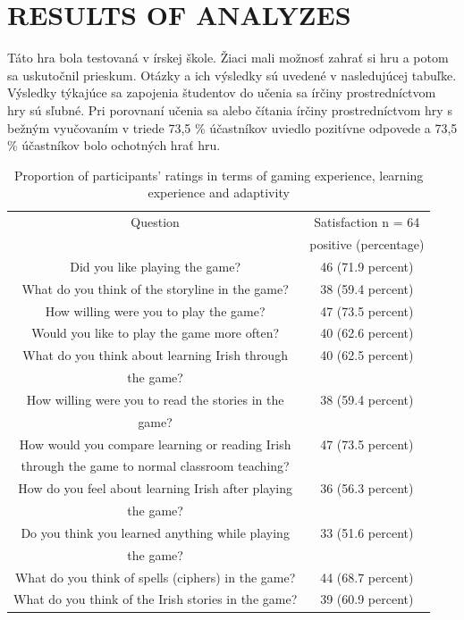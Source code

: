 \documentclass[10pt,twoside,slovak,a4paper]{article}
\begin{document}
\section{RESULTS OF ANALYZES }
\qquad Táto hra bola testovaná v írskej škole. Žiaci mali možnosť zahrať si hru a potom sa uskutočnil prieskum. Otázky a ich výsledky sú uvedené v nasledujúcej tabuľke. Výsledky týkajúce sa zapojenia študentov do učenia sa írčiny prostredníctvom hry sú sľubné. Pri porovnaní učenia sa alebo čítania írčiny prostredníctvom hry s bežným vyučovaním v triede 73,5 \% účastníkov uviedlo pozitívne odpovede a 73,5 \% účastníkov bolo ochotných hrať hru.\\
\begin{table}
\centering
\begin{tabular}{|c|c|}
\hline
Question &Satisfaction n = 64\\
          &positive (percentage)\\
\hline
Did you like playing the game? &46 (71.9 percent)\\
\hline
What do you think of the storyline in the game? & 38 (59.4 percent)\\
\hline
How willing were you to play the game?& 47 (73.5 percent)\\
\hline
Would you like to play the game more often? &40 (62.6 percent)\\
\hline
What do you think about learning Irish through &40 (62.5 percent)\\
the game? &\\
\hline
How willing were you to read the stories in the&38 (59.4 percent)\\
game?&\\
\hline
How would you compare learning or reading Irish &47 (73.5 percent)\\
through the game to normal classroom teaching?&\\
\hline
How do you feel about learning Irish after playing & 36 (56.3 percent)\\
the game? &\\
\hline
Do you think you learned anything while playing & 33 (51.6 percent)\\
the game? &\\
\hline
What do you think of spells (ciphers) in the game? &44 (68.7 percent)\\
\hline
What do you think of the Irish stories in the game? &39 (60.9 percent)\\
\hline
\end{tabular}
\caption{Proportion of participants’ ratings in terms of gaming experience, learning experience and adaptivity}
\label{tab:corr}
\end{table}
\end{document}
